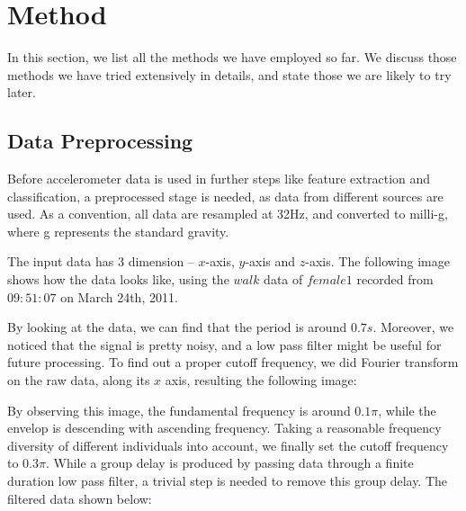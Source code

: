 \documentclass[10pt,twocolumn,letterpaper]{article}
\begin{document}
\section{Method}

In this section, we list all the methods we have employed so far. We discuss those methods we have tried extensively in details, and state those we are likely to try later.

\subsection{Data Preprocessing}

Before accelerometer data is used in further steps like feature extraction and classification, a preprocessed stage is needed, as data from different sources are used. As a convention, all data are resampled at 32Hz, and converted to milli-g, where g represents the standard gravity.

The input data has 3 dimension -- $x$-axis, $y$-axis and $z$-axis. The following image shows how the data looks like, using the $walk$ data of $female 1$ recorded from $09:51:07$ on March 24th, 2011. 

\begin{figure}[t]
\begin{center}
\fbox{\rule{0pt}{2in} \rule{0.9\linewidth}{0pt}}
   \caption{}
\end{center}
\end{figure}

By looking at the data, we can find that the period is around $0.7s$. Moreover, we noticed that the signal is pretty noisy, and a low pass filter might be useful for future processing. To find out a proper cutoff frequency, we did Fourier transform on the raw data, along its $x$ axis, resulting the following image:

\begin{figure}[t]
\begin{center}
\fbox{\rule{0pt}{2in} \rule{0.9\linewidth}{0pt}}
   \caption{}
\end{center}
\end{figure}

By observing this image, the fundamental frequency is around $0.1\pi$, while the envelop is descending with ascending frequency. Taking a reasonable frequency diversity of different individuals into account, we finally set the cutoff frequency to $0.3\pi$. While a group delay is produced by passing data through a finite duration low pass filter, a trivial step is needed to remove this group delay. The filtered data shown below:
\end{document}
